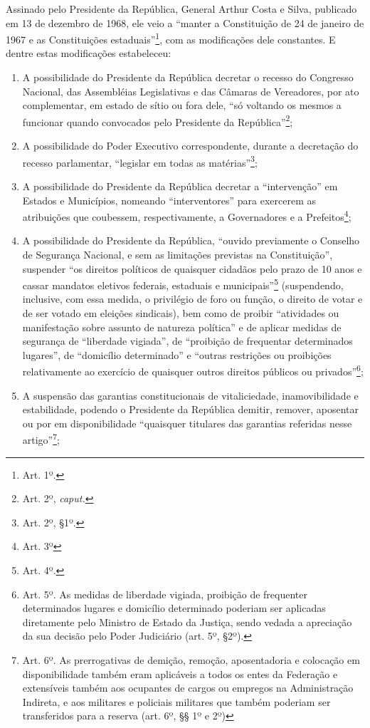 Assinado pelo Presidente da República, General Arthur Costa e Silva,
publicado em 13 de dezembro de 1968, ele veio a ``manter a
Constituição de 24 de janeiro de 1967 e as Constituições
estaduais''\footnote{Art. 1º.}, com as modificações dele constantes. E
dentre estas modificações estabeleceu:

\begin{enumerate}
\item{}A possibilidade do Presidente da República decretar o recesso do
Congresso Nacional, das Assembléias Legislativas e das Câmaras de
Vereadores, por ato complementar, em estado de sítio ou fora dele,
``só voltando os mesmos a funcionar quando convocados pelo
Presidente da República''\footnote{Art. 2º, \emph{caput.}};

\item{}A possibilidade do Poder Executivo correspondente, durante a
decretação do recesso parlamentar, ``legislar em todas as
matérias''\footnote{Art. 2º, §1º.};

\item{}A possibilidade do Presidente da República decretar a
``intervenção'' em Estados e Municípios, nomeando
``interventores'' para exercerem as atribuições que coubessem,
respectivamente, a Governadores e a Prefeitos\footnote{Art. 3º};

\item{}A possibilidade do Presidente da República, ``ouvido
previamente o Conselho de Segurança Nacional, e sem as limitações
previstas na Constituição'', suspender ``os direitos políticos de
quaisquer cidadãos pelo prazo de 10 anos e cassar mandatos eletivos
federais, estaduais e municipais''\footnote{Art. 4º.} (suspendendo,
inclusive, com essa medida, o privilégio de foro ou função, o direito de
votar e de ser votado em eleições sindicais), bem como de proibir
``atividades ou manifestação sobre assunto de natureza política''
e de aplicar medidas de segurança de ``liberdade vigiada'', de
``proibição de frequentar determinados lugares'', de
``domicílio determinado'' e ``outras restrições ou
proibições relativamente ao exercício de quaisquer outros direitos
públicos ou privados''\footnote{Art. 5º. As medidas de liberdade
  vigiada, proibição de frequenter determinados lugares e domicílio
  determinado poderiam ser aplicadas diretamente pelo Ministro de Estado
  da Justiça, sendo vedada a apreciação da sua decisão pelo Poder
  Judiciário (art. 5º, §2º).};

\item{}A suspensão das garantias constitucionais de vitaliciedade,
inamovibilidade e estabilidade, podendo o Presidente da República
demitir, remover, aposentar ou por em disponibilidade ``quaisquer
titulares das garantias referidas nesse artigo''\footnote{Art. 6º. As
  prerrogativas de demição, remoção, aposentadoria e colocação em
  disponibilidade também eram aplicáveis a todos os entes da Federação e
  extensíveis também aos ocupantes de cargos ou empregos na
  Administração Indireta, e aos militares e policiais militares que
  também poderiam ser transferidos para a reserva (art. 6º, §§ 1º e 2º)};


\end{enumerate}
